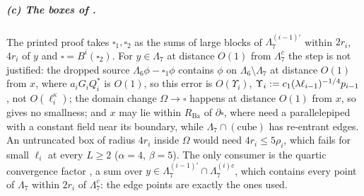 \subparagraph{(c) The boxes of \cite[Lemma~2.4]{Ba2}.} The printed proof \cite[p.~572]{Ba2} takes $\square_1,\square_2$ as the sums of large blocks of $\Lambda_7^{(i-1)\prime}$ within $2r_i$, $4r_i$ of $y$ and $\square=B^i(\square_2)$. For $y\in\Lambda_7$ at distance $O(1)$ from $\Lambda_7^c$ the step \cite[(2.67)]{Ba2} is not justified: the dropped source $\Lambda_6\phi-\square_1\phi$ contains $\phi$ on $\Lambda_6\setminus\Lambda_7$ at distance $O(1)$ from $x$, where $a_iG_iQ_i^*$ is $O(1)$, so this error is $O(\Upsilon_i)$, $\Upsilon_i:= c_1(\lambda\ell_{i-1})^{-1/4}p_{i-1}$, not $O(\ell_i^\kappa)$; the domain change $\Omega\to\square$ happens at distance $O(1)$ from $x$, so \cite[(2.26)]{Ba1} gives no smallness; and $x$ may lie within $R_{\mathrm{Ba}}$ of $\partial\square$, where \cite[(2.24)--(2.25)]{Ba1} need a parallelepiped with a constant field near its boundary, while $\Lambda_7\cap(\text{cube})$ has re-entrant edges. An untruncated box of radius $4r_i$ inside $\Omega$ would need $4r_i\le5\rho_i$, which fails for small $\ell_i$ at every $L\ge2$ ($\alpha=4$, $\beta=5$). The only consumer is the quartic convergence factor \cite[(2.78)--(2.79)]{Ba2}, a sum over $y\in\Lambda_7^{(i-1)\prime}\cap\Lambda_7^{(i)c}$, which contains every point of $\Lambda_7$ within $2r_i$ of $\Lambda_7^c$: the edge points are exactly the ones used.

